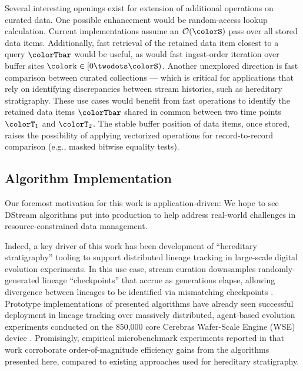 Several interesting openings exist for extension of additional operations on curated data.
One possible enhancement would be random-access lookup calculation.
Current implementations assume an $\mathcal{O}(\colorS)$ pass over all stored data items.
Additionally, fast retrieval of the retained data item closest to a query $\colorTbar$ would be useful, as would fast ingest-order iteration over buffer sites $\colork \in [0 \twodots \colorS)$.
Another unexplored direction is fast comparison between curated collections --- which is critical for applications that rely on identifying discrepancies between stream histories, such as hereditary stratigraphy.
These use cases would benefit from fast operations to identify the retained data items $\colorTbar$ shared in common between two time points $\colorT_1$ and $\colorT_2$.
The stable buffer position of data items, once stored, raises the possibility of applying vectorized operations for record-to-record comparison (e.g., masked bitwise equality tests).


\subsection{Algorithm Implementation}

Our foremost motivation for this work is application-driven: We hope to see DStream algorithms put into production to help address real-world challenges in resource-constrained data management.

Indeed, a key driver of this work has been development of ``hereditary stratigraphy'' tooling to support distributed lineage tracking in large-scale digital evolution experiments.
In this use case, stream curation downsamples randomly-generated lineage ``checkpoints'' that accrue as generations elapse, allowing divergence between lineages to be identified via mismatching checkpoints \citep{moreno2022hereditary}.
Prototype implementations of presented algorithms have already seen successful deployment in lineage tracking over massively distributed, agent-based evolution experiments conducted on the 850,000 core Cerebras Wafer-Scale Engine (WSE) device \citep{moreno2024trackable}.
Promisingly, empirical microbenchmark experiments reported in that work corroborate order-of-magnitude efficiency gains from the algorithms presented here, compared to existing approaches used for hereditary stratigraphy.

